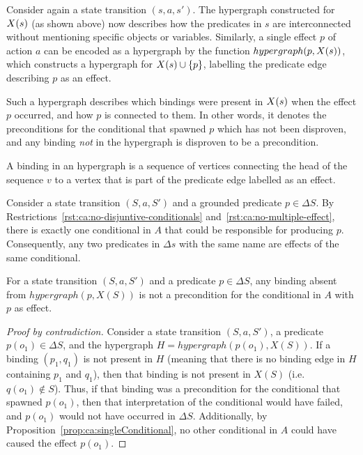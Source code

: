 \documentclass[../Master.tex]{subfiles}
\begin{document}
Consider again a state transition $\left( s, a, s' \right)$. The hypergraph constructed for $X(s)$ (as shown above) now describes how the predicates in $s$ are interconnected without mentioning specific objects or variables. Similarly, a single effect $p$ of action $a$ can be encoded as a hypergraph by the function $hypergraph(p,X(s))$, which constructs a hypergraph for $X(s) \cup \{p\}$, labelling the predicate edge describing $p$ as an effect.

Such a hypergraph describes which bindings were present in $X(s)$ when the effect $p$ occurred, and how $p$ is connected to them. In other words, it denotes the preconditions for the conditional that spawned $p$ which has not been disproven, and any binding \textit{not} in the hypergraph is disproven to be a precondition.

\begin{definition}
    A binding in an hypergraph is a sequence of vertices connecting the head of the sequence $v$ to a vertex that is part of the predicate edge labelled as an effect. 
\end{definition}

\begin{proposition}\label{prop:ca:singleConditional}
    Consider a state transition $\left(S, a, S'\right)$ and a grounded predicate $p \in \Delta S$. By Restrictions~\ref{rst:ca:no-disjuntive-conditionals} and~\ref{rst:ca:no-multiple-effect}, there is exactly one conditional in $A$ that could be responsible for producing $p$. Consequently, any two predicates in $\Delta s$ with the same name are effects of the same conditional.
\end{proposition}

\begin{proposition}\label{prop:ca:disprovenHg}
    For a state transition $\left( S, a, S' \right)$ and a predicate $p \in \Delta S$, any binding absent from $hypergraph \left( p, X(S) \right)$ is not a precondition for the conditional in $A$ with $p$ as effect. 
\end{proposition}

\begin{proof}[Proof by contradiction]
    Consider a state transition $\left( S, a, S' \right)$, a predicate $p \left( o_1 \right) \in \Delta S$, and the hypergraph $H = hypergraph\left( p\left(o_1\right), X(S) \right)$. If a binding $(p_1, q_1)$ is not present in $H$ (meaning that there is no binding edge in $H$ containing $p_1$ and $q_1$), then that binding is not present in $X(S)$ (i.e.\ $q\left(o_1\right) \notin S$). Thus, if that binding was a precondition for the conditional that spawned $p\left(o_1\right)$, then that interpretation of the conditional would have failed, and $p\left( o_1 \right)$ would not have occurred in $\Delta S$. Additionally, by Proposition~\ref{prop:ca:singleConditional}, no other conditional in $A$ could have caused the effect $p \left(o_1\right)$.
\end{proof}
\end{document}
